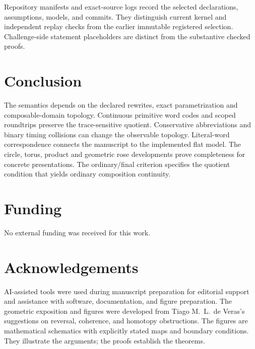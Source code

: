 \documentclass[10pt,reqno]{amsart}
\theoremstyle{definition}
\theoremstyle{plain}
\theoremstyle{remark}
\begin{document}
Repository manifests and exact-source logs record the selected declarations,
assumptions, models, and commits. They distinguish current kernel and
independent replay checks from the earlier immutable registered selection.
Challenge-side statement placeholders are distinct from the substantive
checked proofs.

\section{Conclusion}
The semantics depends on the declared rewrites, exact parametrization and
composable-domain topology. Continuous primitive word codes and scoped
roundtrips preserve the trace-sensitive quotient. Conservative abbreviations
and binary timing collisions can change the observable topology. Literal-word
correspondence connects the manuscript to the implemented flat model.
The circle, torus, product and geometric rose developments prove completeness
for concrete presentations. The ordinary/final criterion specifies the quotient
condition that yields ordinary composition continuity.

\section*{Funding}
No external funding was received for this work.

\section*{Acknowledgements}
AI-assisted tools were used during manuscript preparation for editorial
support and assistance with software, documentation, and figure preparation.
The geometric exposition and figures were developed from Tiago M.~L.~de
Veras's suggestions on reversal, coherence, and homotopy obstructions.
The figures are mathematical schematics with explicitly stated maps and
boundary conditions. They illustrate the arguments; the proofs establish
the theorems.



\begingroup\small\endgroup
\end{document}
